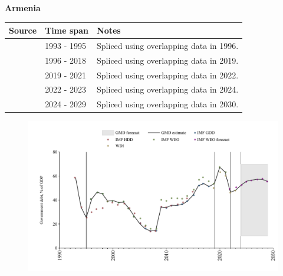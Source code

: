 \documentclass[12pt,a4paper,landscape]{article}
\begin{document}
\begin{adjustbox}{max totalsize={\paperwidth}{\paperheight},center}
\begin{minipage}[t][\textheight][t]{\textwidth}
\vspace*{0.5cm}
{}
\begin{center}
{\Large\bfseries Armenia}
\end{center}
\vspace{0.5cm}
\begin{table}[H]
\centering
\small
\begin{tabular}{|l|l|l|}
\hline
\textbf{Source} & \textbf{Time span} & \textbf{Notes} \\
\hline
\rowcolor{white}\cite{IMF_HDD}& 1993 - 1995 &Spliced using overlapping data in 1996.\\
\rowcolor{lightgray}\cite{IMF_GDD}& 1996 - 2018 &Spliced using overlapping data in 2019.\\
\rowcolor{white}\cite{IMF_WEO}& 2019 - 2021 &Spliced using overlapping data in 2022.\\
\rowcolor{lightgray}\cite{WDI}& 2022 - 2023 &Spliced using overlapping data in 2024.\\
\rowcolor{white}\cite{IMF_WEO_forecast}& 2024 - 2029 &Spliced using overlapping data in 2030.\\
\hline
\end{tabular}
\end{table}
\begin{figure}[H]
\centering
\includegraphics[width=\textwidth,height=0.6\textheight,keepaspectratio]{graphs/ARM_govdebt_GDP.pdf}
\end{figure}
\end{minipage}
\end{adjustbox}
\end{document}
